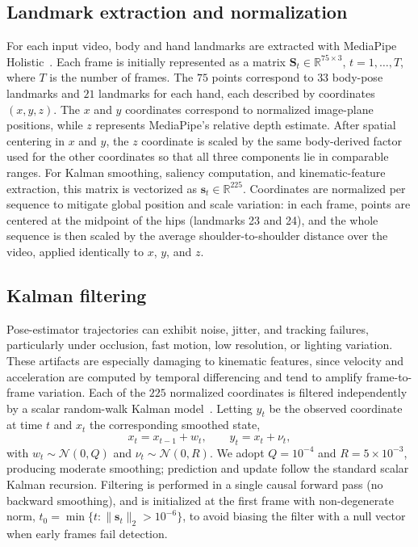 \documentclass[journal]{IEEEtran}
\begin{document}
\subsection{Landmark extraction and normalization}
For each input video, body and hand landmarks are extracted with MediaPipe Holistic~\cite{lugaresi2019mediapipe}. Each frame is initially represented as a matrix $\mathbf{S}_t \in \mathbb{R}^{75\times3}$, $t=1,\dots,T$, where $T$ is the number of frames. The $75$ points correspond to $33$ body-pose landmarks and $21$ landmarks for each hand, each described by coordinates $(x,y,z)$. The $x$ and $y$ coordinates correspond to normalized image-plane positions, while $z$ represents MediaPipe's relative depth estimate. After spatial centering in $x$ and $y$, the $z$ coordinate is scaled by the same body-derived factor used for the other coordinates so that all three components lie in comparable ranges. For Kalman smoothing, saliency computation, and kinematic-feature extraction, this matrix is vectorized as $\mathbf{s}_t \in \mathbb{R}^{225}$. Coordinates are normalized per sequence to mitigate global position and scale variation: in each frame, points are centered at the midpoint of the hips (landmarks 23 and 24), and the whole sequence is then scaled by the average shoulder-to-shoulder distance over the video, applied identically to $x$, $y$, and $z$.

\subsection{Kalman filtering}
Pose-estimator trajectories can exhibit noise, jitter, and tracking failures, particularly under occlusion, fast motion, low resolution, or lighting variation. These artifacts are especially damaging to kinematic features, since velocity and acceleration are computed by temporal differencing and tend to amplify frame-to-frame variation. Each of the $225$ normalized coordinates is filtered independently by a scalar random-walk Kalman model~\cite{kalman1960}. Letting $y_t$ be the observed coordinate at time $t$ and $x_t$ the corresponding smoothed state,
\begin{equation}
x_t = x_{t-1} + w_t, \qquad y_t = x_t + \nu_t,
\label{eq:kalman}
\end{equation}
with $w_t\sim\mathcal{N}(0,Q)$ and $\nu_t\sim\mathcal{N}(0,R)$. We adopt $Q=10^{-4}$ and $R=5\times10^{-3}$, producing moderate smoothing; prediction and update follow the standard scalar Kalman recursion. Filtering is performed in a single causal forward pass (no backward smoothing), and is initialized at the first frame with non-degenerate norm, $t_0=\min\{t:\|\mathbf{s}_t\|_2>10^{-6}\}$, to avoid biasing the filter with a null vector when early frames fail detection.
\end{document}
